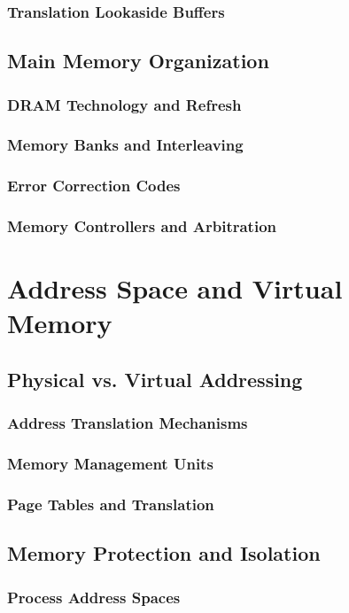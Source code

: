 \documentclass[12pt, oneside, openany]{book}
\begin{document}
\subsubsection{Translation Lookaside Buffers}

\subsection{Main Memory Organization}
\subsubsection{DRAM Technology and Refresh}
\subsubsection{Memory Banks and Interleaving}
\subsubsection{Error Correction Codes}
\subsubsection{Memory Controllers and Arbitration}

\section{Address Space and Virtual Memory}
\subsection{Physical vs. Virtual Addressing}
\subsubsection{Address Translation Mechanisms}
\subsubsection{Memory Management Units}
\subsubsection{Page Tables and Translation}

\subsection{Memory Protection and Isolation}
\subsubsection{Process Address Spaces}
\end{document}
